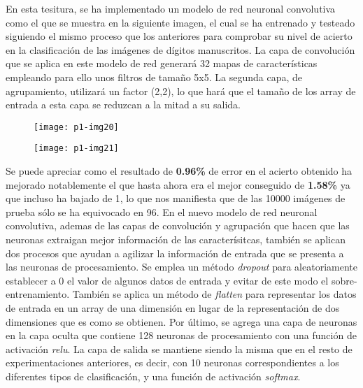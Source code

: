 \documentclass[10pt]{article}
\begin{document}
En esta tesitura, se ha implementado un modelo de red neuronal convolutiva como el que se muestra en la siguiente imagen, el cual se ha entrenado y testeado siguiendo el mismo proceso que los anteriores para comprobar su nivel de acierto en la clasificación de las imágenes de dígitos manuscritos. La capa de convolución que se aplica en este modelo de red generará 32 mapas de características empleando para ello unos filtros de tamaño 5x5. La segunda capa, de agrupamiento, utilizará un factor (2,2), lo que hará que el tamaño de los array de entrada a esta capa se reduzcan a la mitad a su salida. \\

\begin{figure}[H]
	\begin{center}
 		\texttt{[image: p1-img20]}
	\end{center} 
\end{figure}

\begin{figure}[H]
	\begin{center}
 		\texttt{[image: p1-img21]}
	\end{center} 
\end{figure}

Se puede apreciar como el resultado de \textbf{0.96\%} de error en el acierto obtenido ha mejorado notablemente el que hasta ahora era el mejor conseguido de \textbf{1.58\%} ya que incluso ha bajado de 1, lo que nos manifiesta que de las 10000 imágenes de prueba sólo se ha equivocado en 96. En el nuevo modelo de red neuronal convolutiva, ademas de las capas de convolución y agrupación que hacen que las neuronas extraigan mejor información de las caracterísitcas, también se aplican dos procesos que ayudan a agilizar la información de entrada que se presenta a las neuronas de procesamiento. Se emplea un método \textit{dropout} para aleatoriamente establecer a 0 el valor de algunos datos de entrada y evitar de este modo el sobre-entrenamiento. También se aplica un método de \textit{flatten} para representar los datos de entrada en un array de una dimensión en lugar de la representación de dos dimensiones que es como se obtienen. Por último, se agrega una capa de neuronas en la capa oculta que contiene 128 neuronas de procesamiento con una función de activación  \textit{relu}. La capa de salida se mantiene siendo la misma que en el resto de experimentaciones anteriores, es decir, con 10 neuronas correspondientes a los diferentes tipos de clasificación, y una función de activación \textit{softmax}.\\
\end{document}
